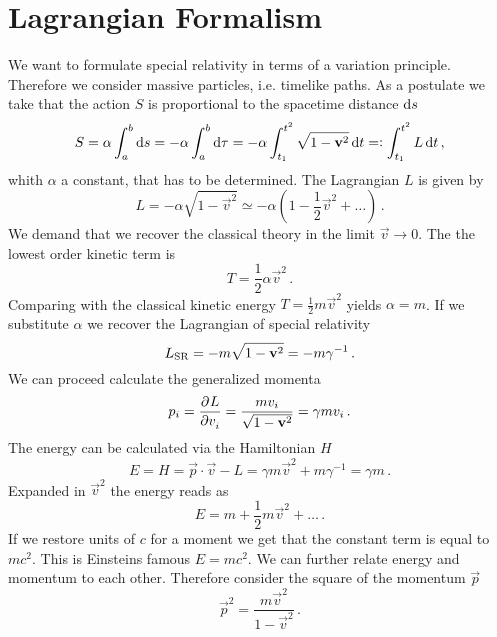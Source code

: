 \section{Lagrangian Formalism}
We want to formulate special relativity in terms of a variation principle. 
Therefore we consider massive particles, i.e. timelike paths. As a postulate we
take that the action $S$ is proportional to the spacetime distance $\dif s$
\begin{equation}
S= \alpha \int_a^b\dif s=- \alpha \int_a^b\dif \tau = -\alpha
\int_{t_1}^{t^2}\sqrt{1-\vec{v}^2}\dif t =: \int_{t_1}^{t^2}L\dif t\, ,
\end{equation}
whith $\alpha$ a constant, that has to be determined. The Lagrangian $L$ is
given by
\begin{equation}
L=-\alpha\sqrt{1-\vec{v}^2}\simeq
-\alpha\left(1-\frac{1}{2}\vec{v}^2+\ldots\right) \, .
\end{equation}
We demand that we recover the classical theory in the limit $\vec{v}\to 0$. The
the lowest order kinetic term is 
\begin{equation}
T=\frac{1}{2}\alpha \vec{v}^2\, .
\end{equation}
Comparing with the classical kinetic energy $T=\frac{1}{2}m\vec{v}^2$ yields
$\alpha=m$. If we substitute $\alpha$ we recover the Lagrangian of special
relativity
\begin{equation}
L\textsubscript{SR}=-m\sqrt{1-\vec{v}^2}=-m\gamma^{-1}\, .
\end{equation}
We can proceed calculate the generalized momenta
\begin{equation}
p_i=\dpd{L}{v_i}=\frac{mv_i}{\sqrt{1-\vec{v}^2}}=\gamma m v_i\, .
\end{equation}
The energy can be calculated via the Hamiltonian $H$
\begin{equation}
E=H=\vec{p}\cdot\vec{v}-L=\gamma m \vec{v}^2 + m\gamma^{-1} =\gamma m\, .
\end{equation}
Expanded in $\vec{v}^2$ the energy reads as
\begin{equation}
E=m+\frac{1}{2}m\vec{v}^2+\ldots\, .
\end{equation}
If we restore units of $c$ for a moment we get that the constant term is
equal to $mc^2$. This is Einsteins famous $E=mc^2$. 
We can further relate energy and momentum to each other. Therefore consider the
square of the momentum $\vec{p}$
\begin{equation}
\vec{p}^2=\frac{m\vec{v}^2}{1-\vec{v}^2}\, .
\end{equation}
